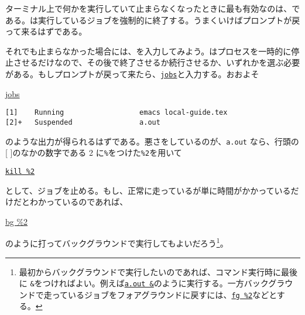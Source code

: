 ターミナル上で何かを実行していて止まらなくなったときに最も有効なのは、である。は実行しているジョブを強制的に終了する。うまくいけばプロンプトが戻って来るはずである。

それでも止まらなかった場合には、を入力してみよう。はプロセスを一時的に停止させるだけなので、その後で終了させるか続行させるか、いずれかを選ぶ必要がある。もしプロンプトが戻って来たら、\underline{\texttt{jobs}}と入力する。おおよそ
\begin{commandline2}
    \prompt \underline{jobs}
    \vspace*{-.8em}
    \begin{verbatim}
[1]    Running                  emacs local-guide.tex
[2]+   Suspended                a.out
\end{verbatim}
\end{commandline2} \noindent
のような出力が得られるはずである。悪さをしているのが、\texttt{a.out} なら、行頭の[ ]のなかの数字である 2 に\texttt{\%}をつけた\texttt{\%2}を用いて
\begin{commandline2}
    \prompt \underline{\texttt{kill \%2}}
\end{commandline2} \noindent
として、ジョブを止める。もし、正常に走っているが単に時間がかかっているだけだとわかっているのであれば、
\begin{commandline2}
    \prompt \underline{bg \%2}
\end{commandline2} \noindent
のように打ってバックグラウンドで実行してもよいだろう\footnote{最初からバックグラウンドで実行したいのであれば、コマンド実行時に最後に \texttt{\&}をつければよい。例えば\underline{\texttt{a.out \&}}のように実行する。一方バックグラウンドで走っているジョブをフォアグラウンドに戻すには、\underline{\texttt{fg \%2}}などとする。}。

